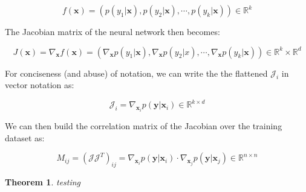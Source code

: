 \documentclass{article}
\newtheorem{theorem}{Theorem}
\newcommand{\R}{\mathbb{R}}
\newcommand{\matr}[1]{\mathbf{#1}}
\begin{document}
\begin{equation}
f(\matr{x})  = (p(y_1| \matr{x}), p(y_2| \matr{x}), \cdots, p(y_k| \matr{x})) \in \R^k
\end{equation}

The Jacobian matrix of the neural network then becomes:

\begin{equation}
J(\matr{x}) = \nabla_{\matr{x}} f(\matr{x}) = (\nabla_{\matr{x}} p(y_1| \matr{x}), \nabla_{\matr{x}} p(y_2| x), \cdots, \nabla_{\matr{x}} p(y_k| \matr{x})) \in \R^k \times \R^d 
\end{equation}

For conciseness (and abuse) of notation, we can write the the flattened $\mathcal{J}_i$ in vector notation as:

\begin{equation}
\mathcal{J}_i = \nabla_{\matr{x}_i} p(\matr{y} | \matr{x}_i) \in \R^{k \times d}
\end{equation}

We can then build the correlation matrix of the Jacobian over the training dataset as:

\begin{equation}
M_{ij} = (\mathcal{J} \mathcal{J}^T)_{ij} = \nabla_{\matr{x}_i} p(\matr{y}|\matr{x}_i) \cdot \nabla_{\matr{x}_j} p(\matr{y}|\matr{x}_j) \in \R^{n \times n} 
\end{equation}

\begin{theorem}
testing
\end{theorem}




\end{document}
